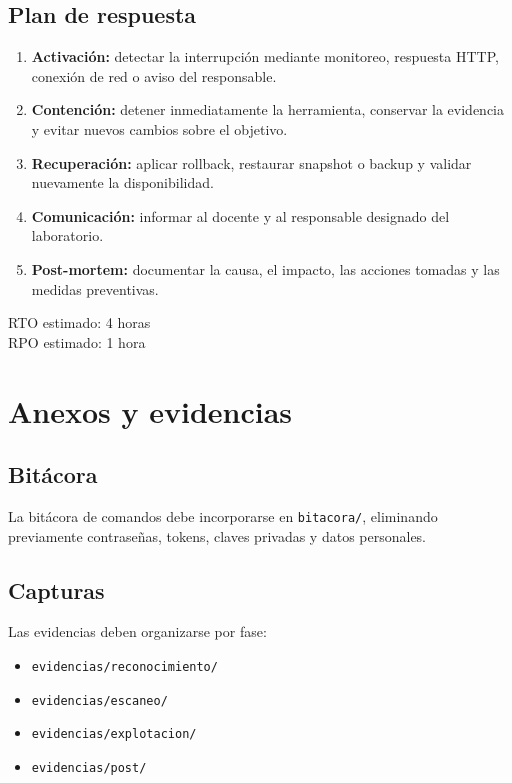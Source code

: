 \documentclass[11pt,a4paper]{article}
\begin{document}
\subsection{Plan de respuesta}
\begin{enumerate}[leftmargin=*]
  \item \textbf{Activación:} detectar la interrupción mediante monitoreo, respuesta HTTP, conexión de red o aviso del responsable.
  \item \textbf{Contención:} detener inmediatamente la herramienta, conservar la evidencia y evitar nuevos cambios sobre el objetivo.
  \item \textbf{Recuperación:} aplicar rollback, restaurar snapshot o backup y validar nuevamente la disponibilidad.
  \item \textbf{Comunicación:} informar al docente y al responsable designado del laboratorio.
  \item \textbf{Post-mortem:} documentar la causa, el impacto, las acciones tomadas y las medidas preventivas.
\end{enumerate}

\begin{campo}
RTO estimado: 4 horas\\
RPO estimado: 1 hora
\end{campo}

\section{Anexos y evidencias}

\subsection{Bitácora}
La bitácora de comandos debe incorporarse en \texttt{bitacora/}, eliminando previamente contraseñas, tokens, claves privadas y datos personales.

\subsection{Capturas}
Las evidencias deben organizarse por fase:
\begin{itemize}[leftmargin=*]
  \item \texttt{evidencias/reconocimiento/}
  \item \texttt{evidencias/escaneo/}
  \item \texttt{evidencias/explotacion/}
  \item \texttt{evidencias/post/}
\end{itemize}
\end{document}
